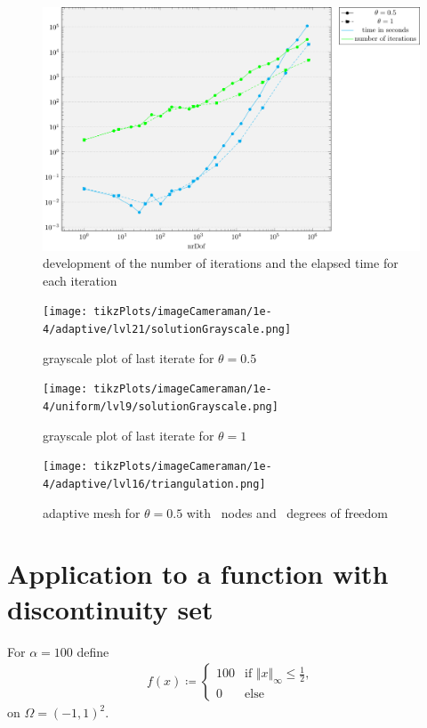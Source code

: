 \documentclass[draft=false,twoside,12pt]{scrreprt}
\begin{document}
\begin{figure}[H]
	\centering
	\includegraphics[width=16cm]{tikzPlots/imageCameraman/misc.pdf}
  \caption{development of the number of iterations and the elapsed time for 
  each iteration}
\end{figure}

\begin{minipage}[t]{0.5\textwidth}
  \begin{figure}[H]
	  \centering
		\texttt{[image: tikzPlots/imageCameraman/1e-4/adaptive/lvl21/solutionGrayscale.png]}
    \caption{grayscale plot of last iterate for $\theta = 0.5$}
  \end{figure}
\end{minipage}
\begin{minipage}[t]{0.5\textwidth}
  \begin{figure}[H]
	  \centering
		\texttt{[image: tikzPlots/imageCameraman/1e-4/uniform/lvl9/solutionGrayscale.png]}
    \caption{grayscale plot of last iterate for $\theta = 1$}
  \end{figure}
\end{minipage}


\begin{figure}[H]
	\centering
  \texttt{[image: tikzPlots/imageCameraman/1e-4/adaptive/lvl16/triangulation.png]}
  \caption{adaptive mesh for $\theta = 0.5$ with \nrNodes\ nodes and 
  \nrDof\ degrees of freedom}
\end{figure}


\section{Application to a function with discontinuity set}
For $\alpha = 100$ define 
\begin{align}
  \label{equ:defMidSqu}
  f(x)\coloneqq 
  \begin{cases}
    100 &\text{if } \Vert x\Vert_\infty\leq \frac{1}{2},\\
    0 &\text{else}
  \end{cases}
\end{align}
on $\Omega = (-1,1)^2$.
\end{document}

